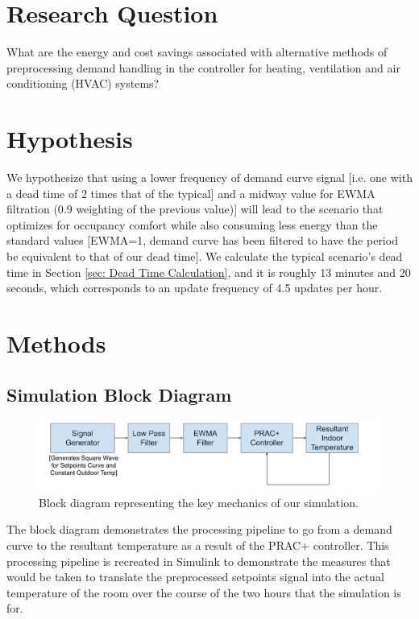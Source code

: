 \documentclass[conference,letterpaper]{IEEEtran}
\begin{document}
\section{Research Question}
\label{sec:Research Question}

What are the energy and cost savings associated with alternative methods of preprocessing demand handling in the controller for heating, ventilation and air conditioning (HVAC) systems?


\section{Hypothesis}
\label{Hypothesis}
We hypothesize that using a lower frequency of demand curve signal [i.e. one with a dead time of 2 times that of the typical] and a midway value for EWMA filtration (0.9 weighting of the previous value)] will lead to the scenario that optimizes for occupancy comfort while also consuming less energy than the standard values [EWMA=1, demand curve has been filtered to have the period be equivalent to that of our dead time]. We calculate the typical scenario's dead time in Section \ref{sec: Dead Time Calculation}, and it is roughly 13 minutes and 20 seconds, which corresponds to an update frequency of 4.5 updates per hour.

\section{Methods}
\label{sec:Methods}

\subsection{Simulation Block Diagram}
\begin{figure}
    \includegraphics[scale=0.47]{blockdiagram.png}
    \caption{Block diagram representing the key mechanics of our simulation.}
\end{figure}


The block diagram demonstrates the processing pipeline to go from a demand curve to the resultant temperature as a result of the PRAC+ controller. This processing pipeline is recreated in Simulink to demonstrate the measures that would be taken to translate the preprocessed setpoints signal into the actual temperature of the room over the course of the two hours that the simulation is for. 
\end{document}
